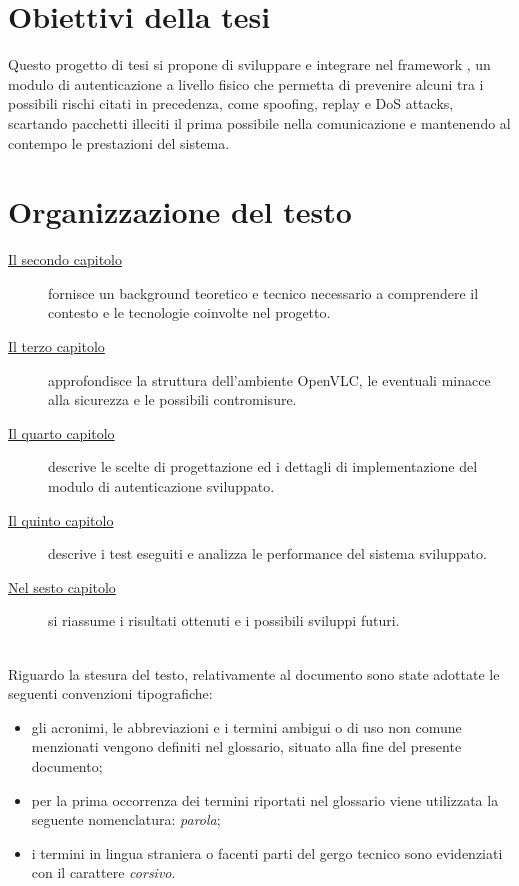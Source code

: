 \section{Obiettivi della tesi}

Questo progetto di tesi si propone di sviluppare e integrare nel framework \cite{site:openvlc}, un modulo di autenticazione a livello fisico che permetta di prevenire alcuni tra i possibili rischi citati in precedenza, come spoofing, replay e DoS attacks, scartando pacchetti illeciti il prima possibile nella comunicazione e mantenendo al contempo le prestazioni del sistema.

\section{Organizzazione del testo}

\begin{description}
    \item[{\hyperref[cap:background]{Il secondo capitolo}}] fornisce un background teoretico e tecnico necessario a comprendere il contesto e le tecnologie coinvolte nel progetto. 
    
    \item[{\hyperref[cap:analisi]{Il terzo capitolo}}] approfondisce la struttura dell'ambiente OpenVLC, le eventuali minacce alla sicurezza e le possibili contromisure.
    
    \item[{\hyperref[cap:progettazione]{Il quarto capitolo}}] descrive le scelte di progettazione ed i dettagli di implementazione del modulo di autenticazione sviluppato.
    
    \item[{\hyperref[cap:test]{Il quinto capitolo}}] descrive i test eseguiti e analizza le performance del sistema sviluppato.
        
    \item[{\hyperref[cap:conclusioni]{Nel sesto capitolo}}] si riassume i risultati ottenuti e i possibili sviluppi futuri.
\end{description}

\noindent \\Riguardo la stesura del testo, relativamente al documento sono state adottate le seguenti convenzioni tipografiche:
\begin{itemize}
	\item gli acronimi, le abbreviazioni e i termini ambigui o di uso non comune menzionati vengono definiti nel glossario, situato alla fine del presente documento;
	\item per la prima occorrenza dei termini riportati nel glossario viene utilizzata la seguente nomenclatura: \emph{parola}\glsfirstoccur;
	\item i termini in lingua straniera o facenti parti del gergo tecnico sono evidenziati con il carattere \emph{corsivo}.
\end{itemize}